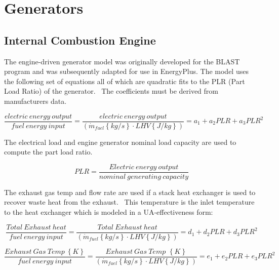 \section{Generators}\label{generators}

\subsection{Internal Combustion Engine}\label{internal-combustion-engine}

The engine-driven generator model was originally developed for the BLAST program and was subsequently adapted for use in EnergyPlus. The model uses the following set of equations all of which are quadratic fits to the PLR (Part Load Ratio) of the generator.~ The coefficients must be derived from manufacturers data.

\begin{equation}
\frac{{electric~energy~output}}{{fuel~energy~input}} = \frac{{electric~energy~output}}{{\left( {{{\dot m}_{fuel}}\left\{ {kg/s} \right\} \cdot LHV\left\{ {J/kg} \right\}} \right)}} = {a_1} + {a_2}PLR + {a_3}PL{R^2}
\end{equation}

The electrical load and engine generator nominal load capacity are used to compute the part load ratio.

\begin{equation}
PLR = \frac{{Electric~energy~output}}{{nominal~generating~capacity}}
\end{equation}

The exhaust gas temp and flow rate are used if a stack heat exchanger is used to recover waste heat from the exhaust.~ This temperature is the inlet temperature to the heat exchanger which is modeled in a UA-effectiveness form:

\begin{equation}
\frac{{Total~Exhaust~heat}}{{fuel~energy~input}} = \frac{{Total~Exhaust~heat}}{{\left( {{{\dot m}_{fuel}}\left\{ {kg/s} \right\} \cdot LHV\left\{ {J/kg} \right\}} \right)}} = {d_1} + {d_2}PLR + {d_3}PL{R^2}
\end{equation}

\begin{equation}
\frac{{Exhaust~Gas~Temp~\left\{ K \right\}}}{{fuel~energy~input}} = \frac{{Exhaust~Gas~Temp\,\,\left\{ K \right\}}}{{\left( {{{\dot m}_{fuel}}\left\{ {kg/s} \right\} \cdot LHV\left\{ {J/kg} \right\}} \right)}} = {e_1} + {e_2}PLR + {e_3}PL{R^2}
\end{equation}

